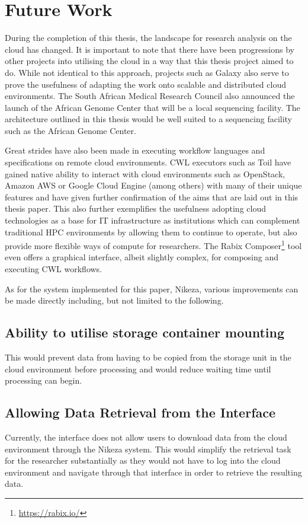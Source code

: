 \section{Future Work}

During the completion of this thesis, the landscape for research analysis on the cloud has changed. It is important to note that there have been progressions by other projects into utilising the cloud in a way that this thesis project aimed to do. While not identical to this approach, projects such as Galaxy also serve to prove the usefulness of adapting the work onto scalable and distributed cloud environments. The South African Medical Research Council also announced the launch of the African Genome Center that will be a local sequencing facility. The architecture outlined in this thesis would be well suited to a sequencing facility such as the African Genome Center.

Great strides have also been made in executing workflow languages and specifications on remote cloud environments. CWL executors such as Toil have gained native ability to interact with cloud environments such as OpenStack, Amazon AWS or Google Cloud Engine (among others) with many of their unique features and have given further confirmation of the aims that are laid out in this thesis paper. This also further exemplifies the usefulness adopting cloud technologies as a base for IT infrastructure as institutions which can complement traditional HPC environments by allowing them to continue to operate, but also provide more flexible ways of compute for researchers. The Rabix Composer\footnote{\url{https://rabix.io/}} tool even offers a graphical interface, albeit slightly complex, for composing and executing CWL workflows.

As for the system implemented for this paper, Nikeza, various improvements can be made directly including, but not limited to the following.

\subsection{Ability to utilise storage container mounting}
This would prevent data from having to be copied from the storage unit in the cloud environment before processing and would reduce waiting time until processing can begin.

\subsection{Allowing Data Retrieval from the Interface}
Currently, the interface does not allow users to download data from the cloud environment through the Nikeza system. This would simplify the retrieval task for the researcher substantially as they would not have to log into the cloud environment and navigate through that interface in order to retrieve the resulting data. 


